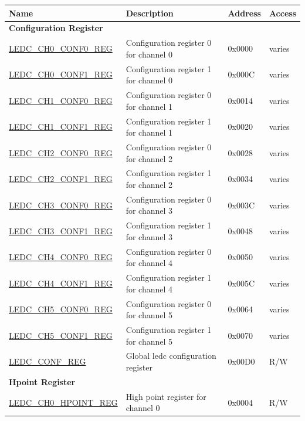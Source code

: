 \begin{longtable}{ | p{5.5cm} | p{7.2cm} | p{1.3cm} | p{1.5cm} | }
\hline\rowcolor{lightgray}
Name & Description &  Address & Access \\ \hline
\endhead
\multicolumn{4}{|l|}{\textbf{Configuration Register}} \\ \hline
\hyperref[regdesc:LEDCCHNCONF0REG]{LEDC\_CH0\_CONF0\_REG} & Configuration register 0 for channel 0 & 0x0000 & varies \\ \hline
\hyperref[regdesc:LEDCCHNCONF1REG]{LEDC\_CH0\_CONF1\_REG} & Configuration register 1 for channel 0 & 0x000C & varies \\ \hline
\hyperref[regdesc:LEDCCHNCONF0REG]{LEDC\_CH1\_CONF0\_REG} & Configuration register 0 for channel 1 & 0x0014 & varies \\ \hline
\hyperref[regdesc:LEDCCHNCONF1REG]{LEDC\_CH1\_CONF1\_REG} & Configuration register 1 for channel 1 & 0x0020 & varies \\ \hline
\hyperref[regdesc:LEDCCHNCONF0REG]{LEDC\_CH2\_CONF0\_REG} & Configuration register 0 for channel 2 & 0x0028 & varies \\ \hline
\hyperref[regdesc:LEDCCHNCONF1REG]{LEDC\_CH2\_CONF1\_REG} & Configuration register 1 for channel 2 & 0x0034 & varies \\ \hline
\hyperref[regdesc:LEDCCHNCONF0REG]{LEDC\_CH3\_CONF0\_REG} & Configuration register 0 for channel 3 & 0x003C & varies \\ \hline
\hyperref[regdesc:LEDCCHNCONF1REG]{LEDC\_CH3\_CONF1\_REG} & Configuration register 1 for channel 3 & 0x0048 & varies \\ \hline
\hyperref[regdesc:LEDCCHNCONF0REG]{LEDC\_CH4\_CONF0\_REG} & Configuration register 0 for channel 4 & 0x0050 & varies \\ \hline
\hyperref[regdesc:LEDCCHNCONF1REG]{LEDC\_CH4\_CONF1\_REG} & Configuration register 1 for channel 4 & 0x005C & varies \\ \hline
\hyperref[regdesc:LEDCCHNCONF0REG]{LEDC\_CH5\_CONF0\_REG} & Configuration register 0 for channel 5 & 0x0064 & varies \\ \hline
\hyperref[regdesc:LEDCCHNCONF1REG]{LEDC\_CH5\_CONF1\_REG} & Configuration register 1 for channel 5 & 0x0070 & varies \\ \hline
\hyperref[regdesc:LEDCCONFREG]{LEDC\_CONF\_REG} & Global ledc configuration register & 0x00D0 & R/W \\ \hline
\multicolumn{4}{|l|}{\textbf{Hpoint Register}} \\ \hline
\hyperref[regdesc:LEDCCHNHPOINTREG]{LEDC\_CH0\_HPOINT\_REG} & High point register for channel 0 & 0x0004 & R/W \\ \hline

\end{longtable}
